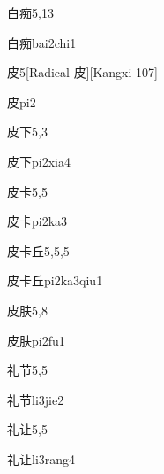 \begin{entry}{白痴}{5,13}
  \begin{phonetics}{白痴}{bai2chi1}
  \end{phonetics}
\end{entry}

\begin{entry}{皮}{5}[Radical 皮][Kangxi 107]
  \begin{phonetics}{皮}{pi2}
  \end{phonetics}
\end{entry}

\begin{entry}{皮下}{5,3}
  \begin{phonetics}{皮下}{pi2xia4}
  \end{phonetics}
\end{entry}

\begin{entry}{皮卡}{5,5}
  \begin{phonetics}{皮卡}{pi2ka3}
  \end{phonetics}
\end{entry}

\begin{entry}{皮卡丘}{5,5,5}
  \begin{phonetics}{皮卡丘}{pi2ka3qiu1}
  \end{phonetics}
\end{entry}

\begin{entry}{皮肤}{5,8}
  \begin{phonetics}{皮肤}{pi2fu1}
  \end{phonetics}
\end{entry}

\begin{entry}{礼节}{5,5}
  \begin{phonetics}{礼节}{li3jie2}
  \end{phonetics}
\end{entry}

\begin{entry}{礼让}{5,5}
  \begin{phonetics}{礼让}{li3rang4}
  \end{phonetics}
\end{entry}


